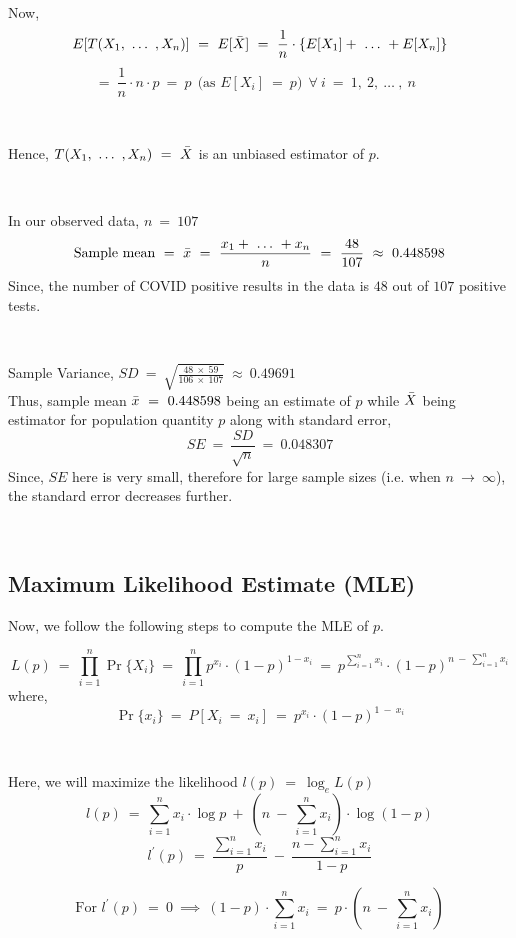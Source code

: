 \ 

Now,
$$E[T(X_{1}, \ \ldots \ , X_{n})] \ = \ E[\Bar{X}] \ = \ \frac{1}{n} \cdot \{ E[X_{1}] + \ \ldots \ + E[X_{n}] \}$$
$$= \ \frac{1}{n}\cdot n\cdot p \ = \ p \ \ \text{(as $E[X_{i}] \ = \ p) \ \ \forall \ i \ = \ 1,\ 2, \ \ldots \ ,\ n$ } $$

\ 

Hence, $T(X_{1}, \ \ldots \ , X_{n}) \ = \ \Bar{X}$ is an unbiased estimator of $p$.

\ 

In our observed data, $n \ = \ 107$
$$\text{Sample mean} \ = \ \Bar{x} \ = \ \frac{x_{1} + \ \ldots \ + x_{n}}{n} \ = \ \frac{48}{107} \ \approx \ 0.448598$$
Since, the number of COVID positive results in the data is $48$ out of $107$ positive tests.

\

Sample Variance, $SD \ = \ \sqrt{\frac{48 \ \times \ 59}{106 \ \times \ 107}} \ \approx \ 0.49691$ \\
Thus, sample mean $\Bar{x} \ = \ 0.448598$ being an estimate of $p$ while $\Bar{X}$ being estimator for population quantity $p$ along with standard error,
$$SE \ = \ \frac{SD}{\sqrt{n}} \ = \ 0.048307$$
Since, $SE$ here is very small, therefore for large sample sizes (i.e. when $n \ \to \ \infty$), the standard error decreases further. 

\ 

\subsection{Maximum Likelihood Estimate (MLE)}

Now, we follow the following steps to compute the MLE of $p$.

$$L(p) \ = \ \prod_{i = 1}^{n} \Pr \{ X_{i} \} \ = \ \prod_{i = 1}^{n} p^{x_{i}} \cdot (1  - p)^{1 - x_{i}} \ = \ p^{\sum_{i = 1}^{n} x_{i}} \cdot (1 - p)^{n \ - \ \sum_{i = 1}^{n} x_{i}}$$
where, $$\Pr \{ x_{i} \} \ = \ P[X_{i} \ = \ x_{i}] \ = \ p^{x_{i}} \cdot (1-p)^{1 \ - \ x_{i}}$$

\ 

Here, we will maximize the likelihood $l(p) \ = \ \log_{e} L(p)$
$$l(p) \ = \ \sum_{i = 1}^{n} x_{i} \cdot \log p \ + \ (n \ - \ \sum_{i = 1}^{n} x_{i}) \cdot \log (1 - p)$$
$$l^{\prime} (p) \ = \ \frac{\sum_{i = 1}^{n} x_{i}}{p} \ - \ \frac{n - \sum_{i = 1}^{n} x_{i}}{1 - p}$$

$$ \text{For } l^{\prime} (p) \ = \ 0 \ \implies \ (1 - p) \cdot \sum_{i = 1}^{n} x_{i} \ = \ p \cdot (n \ - \ \sum_{i = 1}^{n} x_{i})  $$

